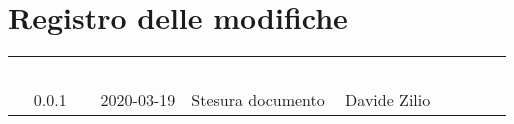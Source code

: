 \section*{Registro delle modifiche}
{
	\centering
	\begin{longtable}{ c c  C{4cm}  c  c }
		\textcolor{white}{\textbf{Versione}} & \textcolor{white}{\textbf{Data}} & \textcolor{white}{\textbf{Descrizione}} & \textcolor{white}{\textbf{Nominativo}} & \textcolor{white}{\textbf{Ruolo}}\\		
		0.0.1 & 2020-03-19 & Stesura documento & Davide Zilio &\reda{}\\		
		
	\end{longtable}

}